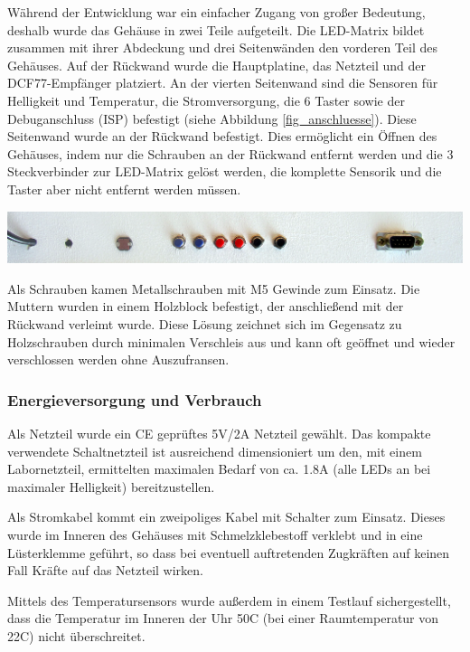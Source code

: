 Während der Entwicklung war ein einfacher Zugang von großer Bedeutung, deshalb wurde das Gehäuse in zwei Teile aufgeteilt. Die LED-Matrix bildet zusammen mit ihrer Abdeckung und drei Seitenwänden den vorderen Teil des Gehäuses. Auf der Rückwand wurde die Hauptplatine, das Netzteil und der DCF77-Empfänger platziert. An der vierten Seitenwand sind die Sensoren für Helligkeit und Temperatur, die Stromversorgung, die 6 Taster sowie der Debuganschluss (ISP) %
befestigt (siehe Abbildung \ref{fig_anschluesse}). Diese Seitenwand wurde an der Rückwand befestigt. Dies ermöglicht ein Öffnen des Gehäuses, indem nur die Schrauben an der Rückwand entfernt werden und die 3 Steckverbinder zur LED-Matrix gelöst werden, die komplette Sensorik und die Taster aber nicht entfernt werden müssen.%
\vspace{2em}
\centerline{\includegraphics[width=\linewidth]{images/anschluesse.png}}
\label{fig_anschluesse}
\vspace{.5em}

Als Schrauben kamen Metallschrauben mit M5 %
Gewinde zum Einsatz. Die Muttern wurden in einem Holzblock befestigt, der anschließend mit der Rückwand verleimt wurde.%
Diese Lösung zeichnet sich im Gegensatz zu Holzschrauben durch minimalen Verschleis aus und kann oft geöffnet und wieder verschlossen werden ohne Auszufransen.

\subsubsection{Energieversorgung und Verbrauch}
Als Netzteil wurde ein CE geprüftes 5V/2A Netzteil gewählt. Das kompakte verwendete Schaltnetzteil ist ausreichend dimensioniert um den, mit einem Labornetzteil, ermittelten maximalen Bedarf von ca. 1.8A%
(alle LEDs an bei maximaler Helligkeit) bereitzustellen.
 
Als Stromkabel kommt ein zweipoliges Kabel mit Schalter zum Einsatz. Dieses wurde im Inneren des Gehäuses mit Schmelzklebestoff verklebt und in eine Lüsterklemme geführt, so dass bei eventuell auftretenden Zugkräften auf keinen Fall Kräfte auf das Netzteil wirken.

Mittels des Temperatursensors wurde außerdem in einem Testlauf sichergestellt, dass die Temperatur im Inneren der Uhr 50\degree C (bei einer Raumtemperatur von 22\degree C) nicht überschreitet.
